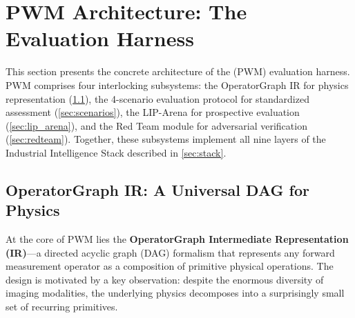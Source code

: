 
\section{PWM Architecture: The Evaluation Harness}
\label{sec:architecture}

This section presents the concrete architecture of the \pwm{} (PWM)
evaluation harness.
PWM comprises four interlocking subsystems: the OperatorGraph IR for
physics representation (\cref{sec:operatorgraph}), the 4-scenario
evaluation protocol for standardized assessment (\cref{sec:scenarios}),
the LIP-Arena for prospective evaluation (\cref{sec:lip_arena}), and
the Red Team module for adversarial verification (\cref{sec:redteam}).
Together, these subsystems implement all nine layers of the Industrial
Intelligence Stack described in \cref{sec:stack}.


\subsection{OperatorGraph IR: A Universal DAG for Physics}
\label{sec:operatorgraph}

At the core of PWM lies the \textbf{OperatorGraph Intermediate
Representation (IR)}---a directed acyclic graph (DAG) formalism that
represents any forward measurement operator as a composition of
primitive physical operations.
The design is motivated by a key observation: despite the enormous
diversity of imaging modalities, the underlying physics decomposes
into a surprisingly small set of recurring primitives.

